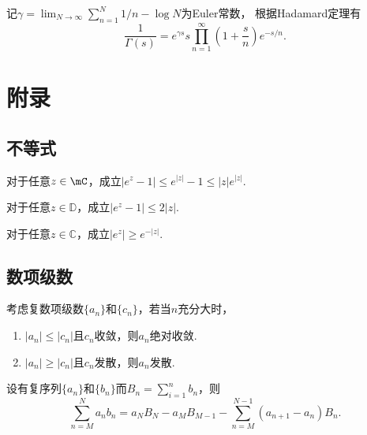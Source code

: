   \begin{thm}
    记$\gamma = \lim_{N\to\infty}\sum_{n=1}^N 1/n - \log N$为Euler常数，
    根据Hadamard定理有
    \[
      \frac{1}{\Gamma(s)} = e^{\gamma s}s\prod_{n=1}^\infty
      \left( 1+\frac{s}{n} \right)e^{-s/n}.
    \]
  \end{thm}



\newpage
\section{附录}

\subsection{不等式}

  \begin{pos}
    对于任意$z\in\mC$，成立$|e^z-1|\le e^{|z|}-1\le |z|e^{|z|}$.
  \end{pos}

  \begin{pos}
    对于任意$z\in\mathbb{D}$，成立$|e^z-1|\le 2|z|$.
  \end{pos}

  \begin{pos}
    对于任意$z\in\mathbb{C}$，成立$|e^z|\ge e^{-|z|}$.
  \end{pos}


\subsection{数项级数}

  \begin{thm}
    考虑复数项级数$\{a_n\}$和$\{c_n\}$，若当$n$充分大时，
    \begin{enumerate}
      \item $|a_n| \le |c_n|$且$c_n$收敛，则$a_n$绝对收敛.
      \item $|a_n| \ge |c_n|$且$c_n$发散，则$a_n$发散.
    \end{enumerate}
  \end{thm}

  \begin{thm}[分部求和]
    \label{thm: 分部求和}
    设有复序列$\{a_n\}$和$\{b_n\}$而$B_n=\sum_{i=1}^nb_n$，则
    \[
      \sum_{n=M}^N a_nb_n = a_NB_N - a_MB_{M-1} -
      \sum_{n=M}^{N-1}(a_{n+1}-a_n)B_n.
    \]
  \end{thm}

